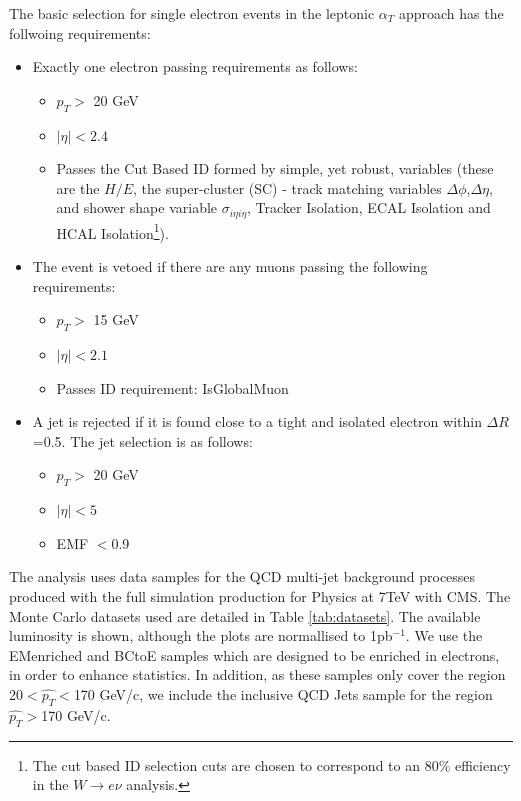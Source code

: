 \documentclass[12pt]{article}
\begin{document}
The basic selection for single electron events in the leptonic $\alpha_{T}$ approach has the follwoing requirements:
\begin{itemize}


\item Exactly one electron passing requirements as follows:
\begin{itemize}
\item $p_{T} >$ 20 GeV
\item $|\eta| <2.4$
\item Passes the Cut Based ID formed by simple, yet robust, variables (these are the $H/E$, the super-cluster (SC) - track matching variables $\Delta \phi$,$\Delta \eta$, and shower shape variable $\sigma_{i\eta i\eta}$, Tracker Isolation, ECAL Isolation and HCAL Isolation\footnote{The cut based ID selection cuts are chosen to correspond to an 80\% efficiency in the $W\rightarrow e\nu$ analysis.}). 
\end{itemize}
\item The event is vetoed if there are any muons passing the following requirements:
\begin{itemize}
\item $p_{T} >$ 15 GeV
\item $|\eta| <2.1$
\item Passes ID requirement: IsGlobalMuon
\end{itemize}
\item A jet is rejected if it is found close to a tight and isolated electron within $\Delta R$=0.5.
 The jet selection is as follows:
\begin{itemize}
\item $p_{T} >$ 20 GeV
\item $|\eta| <5$
\item EMF $<$0.9
\end{itemize}

\end{itemize}

The analysis uses data samples for the QCD multi-jet background processes produced with the full simulation production for Physics at 7TeV with CMS. The Monte Carlo datasets used are detailed in Table \ref{tab:datasets}. The available luminosity is shown, although the plots are normallised to 1pb$^{-1}$. We use the EMenriched and BCtoE samples which are designed to be enriched in electrons, in order to enhance statistics. In addition, as these samples only cover the region 20$<\hat{p_{T}}<$170 GeV/c, we include the inclusive QCD Jets sample for the region $\hat{p_{T}}>$170 GeV/c.
\end{document}
